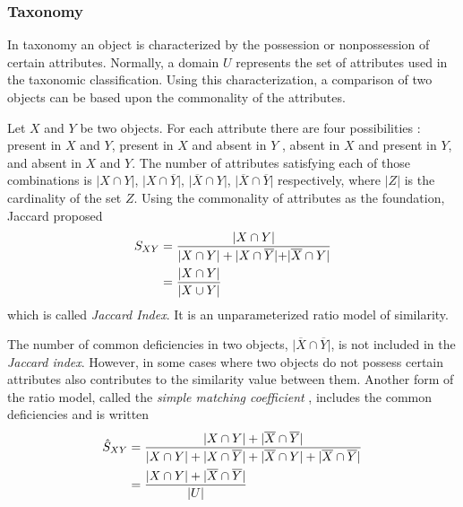 \subsubsection{Taxonomy}
In taxonomy an object is characterized by the possession or nonpossession of certain attributes. Normally, a domain $U$ represents the set of attributes used in the taxonomic classification. Using this characterization, a comparison of two objects can be based upon the commonality of the attributes.

Let $X$ and $Y$ be two objects. For each attribute there are four possibilities : present in $X$ and $Y$, present in $X$ and absent in $Y$ , absent in $X$ and present in $Y$, and absent in $X$ and $Y$. The number of attributes satisfying each of those combinations is $\lvert X \cap Y \rvert$, $\lvert X \cap \overline{Y} \rvert$, $\lvert \overline{X} \cap Y \rvert$, $\lvert \overline{X} \cap \overline{Y} \rvert$ respectively, where $\lvert Z \rvert$ is the cardinality of the set $Z$.
Using the commonality of attributes as the foundation, Jaccard \cite{J08} proposed 
\begin{align}
S_{XY}  & = \frac{\lvert X \cap Y \rvert}{\lvert X \cap Y \rvert + \lvert X \cap \overline{Y} \rvert + \rvert \overline{X} \cap Y \lvert} \notag \\
	      & = \frac{\lvert X \cap Y \rvert}{\lvert X \cup Y \rvert} \notag \label{Jaccard index}\\	
\end{align}
which is called \textit{Jaccard Index}. It is an unparameterized ratio model of similarity.

The number of common deficiencies in two objects, $\lvert \overline{X} \cap \overline{Y} \rvert$, is not included in the \textit{Jaccard index}.  However, in some cases where two objects do not possess certain attributes also contributes to the similarity value between them. Another form of the ratio model, called the \textit{simple matching coefficient} \cite{SS63}, includes the common deficiencies and is written 
\begin{align}
\hat{S}_{XY} & = \frac{\lvert X \cap Y \rvert + \lvert \overline{X} \cap \overline{Y} \rvert}{\lvert X \cap Y \rvert + \lvert X \cap \overline{Y} \rvert + \lvert \overline{X} \cap Y \rvert + \lvert \overline{X} \cap \overline{Y} \rvert} \notag \\
	              & =  \frac{\lvert X \cap Y \rvert + \lvert \overline{X} \cap \overline{Y} \rvert}{\lvert U \rvert} \notag \label{simple matching coefficient}\\
\end{align}

